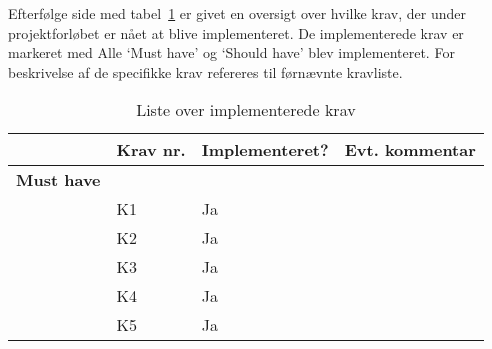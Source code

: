 \documentclass[class=article, crop=false]{standalone}
\begin{document}
    Efterfølge side med tabel~\ref{tab:implementeret_krav_liste} er givet en oversigt over hvilke krav, der under projektforløbet er nået at blive implementeret. De implementerede krav er markeret med Alle ‘Must have’ og ‘Should have’ blev implementeret. For beskrivelse af de specifikke krav refereres til førnævnte kravliste.

    \newpage
    \begin{table}[H]
        \caption{Liste over implementerede krav}
        \label{tab:implementeret_krav_liste}
        \begin{tabularx}{\textwidth}{|l|l|l|X|}
            \hline
            & \textbf{Krav nr.} &\textbf{ Implementeret?     }& \textbf{Evt. kommentar}                                                                                                                                                                                     \\ \hline
            \textbf{Must have}&          &                    &                                                                                                                                                                                                    \\ \hline
            & K1       & Ja                 &                                                                                                                                                                                                    \\ \hline
            & K2       & Ja                 &                                                                                                                                                                                                    \\ \hline
            & K3       & Ja                 &                                                                                                                                                                                                    \\ \hline
            & K4       & Ja                 &                                                                                                                                                                                                    \\ \hline
            & K5       & Ja                 &                                                                                                                                                                                                    \\ \hline

\end{tabularx}
\end{table}
\end{document}
